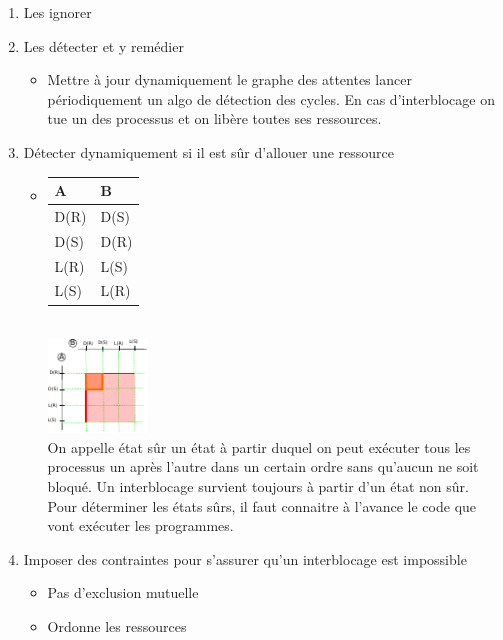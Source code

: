 \begin{enumerate}
	\item Les ignorer
	\item Les détecter et y remédier 
	\begin{itemize}
		\item Mettre à jour dynamiquement le graphe des attentes lancer périodiquement un algo de détection des cycles. En cas d'interblocage on tue un des processus et on libère toutes ses ressources.
	\end{itemize}
	\item Détecter dynamiquement si il est sûr d'allouer une ressource
	\begin{itemize}
		\item 
		\begin{tabular}{l|l}
			A & B \\ \hline
			D(R) & D(S) \\
			D(S) & D(R) \\
			L(R) & L(S) \\
			L(S) & L(R) \\
		\end{tabular} \\
		\includegraphics[width=100px]{fig39.pdf} \\
		On appelle état sûr un état à partir duquel on peut exécuter tous les processus un après l'autre dans un certain ordre sans qu'aucun ne soit bloqué. Un interblocage survient toujours à partir d'un état non sûr. \\ Pour déterminer les états sûrs, il faut connaitre à l'avance le code que vont exécuter les programmes. 
	\end{itemize}
	\item Imposer des contraintes pour s'assurer qu'un interblocage est impossible
	\begin{itemize}
		\item Pas d'exclusion mutuelle
		\item Ordonne les ressources
	\end{itemize}
\end{enumerate}
